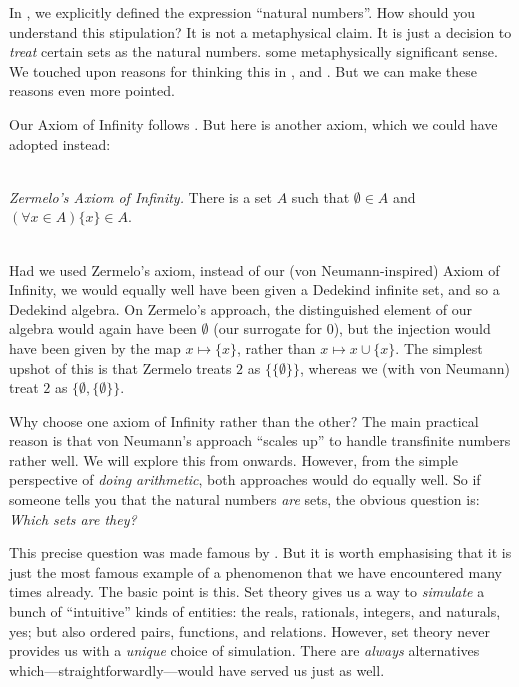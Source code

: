 \documentclass[../../../include/open-logic-section]{subfiles}
\begin{document}
	


In , we explicitly defined
the expression ``natural numbers''. How should you understand this
stipulation? It is not a metaphysical claim. It is just a decision to
\emph{treat} certain sets as the natural numbers. some metaphysically
significant sense. We touched upon reasons for thinking this in
,  and
. But we can make these
reasons even more pointed.

Our Axiom of Infinity follows \citet{VonNeumann1925}. But here is
another axiom, which we could have adopted instead:

\
\\\emph{Zermelo's \citeyear{Zermelo1908Untersuchungen} Axiom of Infinity.} There is a set $A$ such that $\emptyset \in A$ and $(\forall x \in A)\{x\} \in A$. 

\
\\
Had we used Zermelo's axiom, instead of our (von Neumann-inspired)
Axiom of Infinity, we would equally well have been given a Dedekind
infinite set, and so a Dedekind algebra. On Zermelo's approach, the
distinguished element of our algebra would again have been $\emptyset$
(our surrogate for $0$), but the injection would have been given by
the map $x \mapsto \{x\}$, rather than $x \mapsto x \cup \{x\}$. The
simplest upshot of this is that Zermelo treats $2$ as
$\{\{\emptyset\}\}$, whereas we (with von Neumann) treat $2$ as
$\{\emptyset, \{\emptyset\}\}$. 

Why choose one axiom of Infinity rather than the other? The main
practical reason is that von Neumann's approach ``scales up'' to
handle transfinite numbers rather well. We will explore this from
\olref[ordinals][]{chap} onwards. However, from the simple
perspective of \emph{doing arithmetic}, both approaches would do
equally well. So if someone tells you that the natural numbers
\emph{are} sets, the obvious question is: \emph{Which sets are they?} 

This precise question was made famous by \citet{Benacerraf1965}. But
it is worth emphasising that it is just the most famous example of a
phenomenon that we have encountered many times already. The basic
point is this. Set theory gives us a way to \emph{simulate} a bunch of
``intuitive'' kinds of entities: the reals, rationals, integers, and
naturals, yes; but also ordered pairs, functions, and relations.
However, set theory never provides us with a \emph{unique} choice of
simulation. There are \emph{always} alternatives
which---straightforwardly---would have served us just as well. 
\end{document}
